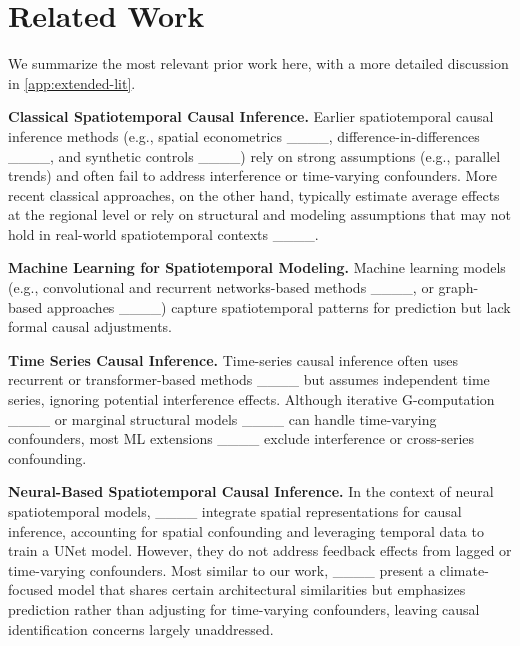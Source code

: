\section{Related Work}
\label{sec:lit-review}

We summarize the most relevant prior work here, with a more detailed discussion in \cref{app:extended-lit}.

\textbf{Classical Spatiotemporal Causal Inference.} Earlier spatiotemporal causal inference methods (e.g., spatial econometrics ____, difference-in-differences ____, and synthetic controls ____) rely on strong assumptions (e.g., parallel trends) and often fail to address interference or time-varying confounders. More recent classical approaches, on the other hand, typically estimate average effects at the regional level or rely on structural and modeling assumptions that may not hold in real-world spatiotemporal contexts ____.

\textbf{Machine Learning for Spatiotemporal Modeling.} Machine learning models (e.g., convolutional and recurrent networks-based methods ____, or graph-based approaches ____) capture spatiotemporal patterns for prediction but lack formal causal adjustments.

\textbf{Time Series Causal Inference.} Time-series causal inference often uses recurrent or transformer-based methods ____ but assumes independent time series, ignoring potential interference effects. Although iterative G-computation ____ or marginal structural models ____ can handle time-varying confounders, most ML extensions ____ exclude interference or cross-series confounding.

\textbf{Neural-Based Spatiotemporal Causal Inference.} In the context of neural spatiotemporal models, ____ integrate spatial representations for causal inference, accounting for spatial confounding and leveraging temporal data to train a UNet model. However, they do not address feedback effects from lagged or time-varying confounders. Most similar to our work, ____ present a climate-focused model that shares certain architectural similarities but emphasizes prediction rather than adjusting for time-varying confounders, leaving causal identification concerns largely unaddressed. 

